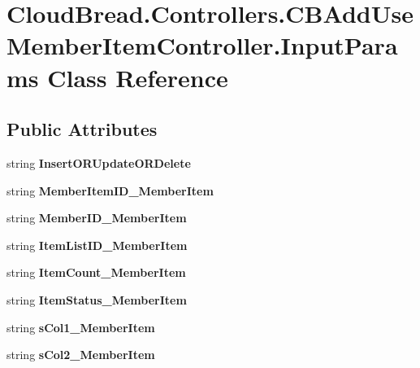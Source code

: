\hypertarget{a00102}{}\section{Cloud\+Bread.\+Controllers.\+C\+B\+Add\+Use\+Member\+Item\+Controller.\+Input\+Params Class Reference}
\label{a00102}
\subsection*{Public Attributes}
\begin{DoxyCompactItemize}
\item 
string {\bfseries Insert\+O\+R\+Update\+O\+R\+Delete}\hypertarget{a00102_abb00a2bdfcedef7868d3e05a3b6743ff}{}\label{a00102_abb00a2bdfcedef7868d3e05a3b6743ff}

\item 
string {\bfseries Member\+Item\+I\+D\+\_\+\+Member\+Item}\hypertarget{a00102_aea9c50717f7a3871bea5eaa5c16ec828}{}\label{a00102_aea9c50717f7a3871bea5eaa5c16ec828}

\item 
string {\bfseries Member\+I\+D\+\_\+\+Member\+Item}\hypertarget{a00102_a8439d879f2e621357dda920f99bdcf94}{}\label{a00102_a8439d879f2e621357dda920f99bdcf94}

\item 
string {\bfseries Item\+List\+I\+D\+\_\+\+Member\+Item}\hypertarget{a00102_ae1d7bb334f5bdb4f61a6aaa5e93e2a40}{}\label{a00102_ae1d7bb334f5bdb4f61a6aaa5e93e2a40}

\item 
string {\bfseries Item\+Count\+\_\+\+Member\+Item}\hypertarget{a00102_aaf2f3d738a6cec7b084795bde15ae251}{}\label{a00102_aaf2f3d738a6cec7b084795bde15ae251}

\item 
string {\bfseries Item\+Status\+\_\+\+Member\+Item}\hypertarget{a00102_acd8537c43a6a39dc78b456fd8ea589cd}{}\label{a00102_acd8537c43a6a39dc78b456fd8ea589cd}

\item 
string {\bfseries s\+Col1\+\_\+\+Member\+Item}\hypertarget{a00102_aae685f01cbe991c28cc555473e893650}{}\label{a00102_aae685f01cbe991c28cc555473e893650}

\item 
string {\bfseries s\+Col2\+\_\+\+Member\+Item}\hypertarget{a00102_a19a61aee0db74feb9781e47c9e4d69ab}{}\label{a00102_a19a61aee0db74feb9781e47c9e4d69ab}


\end{DoxyCompactItemize}
